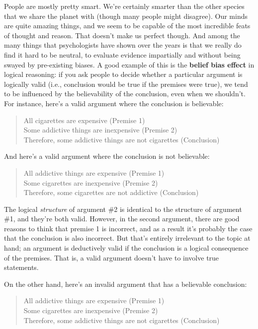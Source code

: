 \documentclass[
  letterpaper,
]{book}
\begin{document}
People are mostly pretty smart. We're certainly smarter than the other
species that we share the planet with (though many people might
disagree). Our minds are quite amazing things, and we seem to be capable
of the most incredible feats of thought and reason. That doesn't make us
perfect though. And among the many things that psychologists have shown
over the years is that we really do find it hard to be neutral, to
evaluate evidence impartially and without being swayed by pre-existing
biases. A good example of this is the \textbf{belief bias effect} in
logical reasoning: if you ask people to decide whether a particular
argument is logically valid (i.e., conclusion would be true if the
premises were true), we tend to be influenced by the believability of
the conclusion, even when we shouldn't. For instance, here's a valid
argument where the conclusion is believable:

\begin{quote}
All cigarettes are expensive (Premise 1)\\
Some addictive things are inexpensive (Premise 2)\\
Therefore, some addictive things are not cigarettes (Conclusion)
\end{quote}

And here's a valid argument where the conclusion is not believable:

\begin{quote}
All addictive things are expensive (Premise 1)\\
Some cigarettes are inexpensive (Premise 2)\\
Therefore, some cigarettes are not addictive (Conclusion)
\end{quote}

The logical \emph{structure} of argument \#2 is identical to the
structure of argument \#1, and they're both valid. However, in the
second argument, there are good reasons to think that premise 1 is
incorrect, and as a result it's probably the case that the conclusion is
also incorrect. But that's entirely irrelevant to the topic at hand; an
argument is deductively valid if the conclusion is a logical consequence
of the premises. That is, a valid argument doesn't have to involve true
statements.

On the other hand, here's an invalid argument that has a believable
conclusion:

\begin{quote}
All addictive things are expensive (Premise 1)\\
Some cigarettes are inexpensive (Premise 2)\\
Therefore, some addictive things are not cigarettes (Conclusion)
\end{quote}
\end{document}
